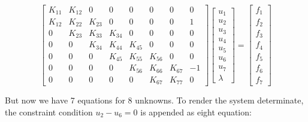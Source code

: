 \documentclass[10pt,b5paper,titlepage]{book}
\begin{document}
\begin{equation}
    \begin{bmatrix}
        K_{11} & K_{12} & 0 & 0 & 0 & 0 & 0 & 0 \\
        K_{12} & K_{22} & K_{23} & 0 & 0 & 0 & 0 & 1 \\
        0 & K_{23} & K_{33} & K_{34} & 0 & 0 & 0 & 0 \\
        0 & 0 & K_{34} & K_{44} & K_{45} & 0 & 0 & 0 \\
        0 & 0 & 0 & K_{45} & K_{55} & K_{56} & 0 & 0 \\
        0 & 0 & 0 & 0 & K_{56} & K_{66} & K_{67} & -1 \\
        0 & 0 & 0 & 0 & 0 & K_{67} & K_{77} & 0
    \end{bmatrix}
    \begin{bmatrix}
        u_1 \\
        u_2 \\
        u_3 \\
        u_4 \\
        u_5 \\
        u_6 \\
        u_7 \\
        \lambda
    \end{bmatrix}
    = \begin{bmatrix}
        f_1 \\
        f_2 \\
        f_3 \\
        f_4 \\
        f_5 \\
        f_6 \\
        f_7
    \end{bmatrix}
\end{equation}

But now we have 7 equations for 8 unknowns. To render the system determinate, the
constraint condition $ u_2 - u_6 = 0 $ is appended as eight equation:
\end{document}
